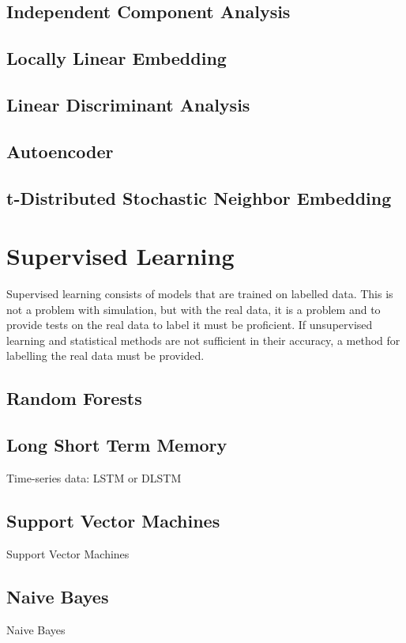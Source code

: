 \subsection{Independent Component Analysis}
\subsection{Locally Linear Embedding}
\subsection{Linear Discriminant Analysis}
\subsection{Autoencoder}
\subsection{t-Distributed Stochastic Neighbor Embedding}

\section{Supervised Learning}
Supervised learning consists of models that are trained on labelled data. This is not a problem with simulation, but with the real data, it is a problem and to provide tests on the real data to label it must be proficient. If unsupervised learning and statistical methods are not sufficient in their accuracy, a method for labelling the real data must be provided.

\subsection{Random Forests}
\cite{Shi2006, Paul2018, Primartha2018}

\subsection{Long Short Term Memory}
Time-series data: LSTM or DLSTM

\subsection{Support Vector Machines}
Support Vector Machines

\subsection{Naive Bayes}
Naive Bayes

